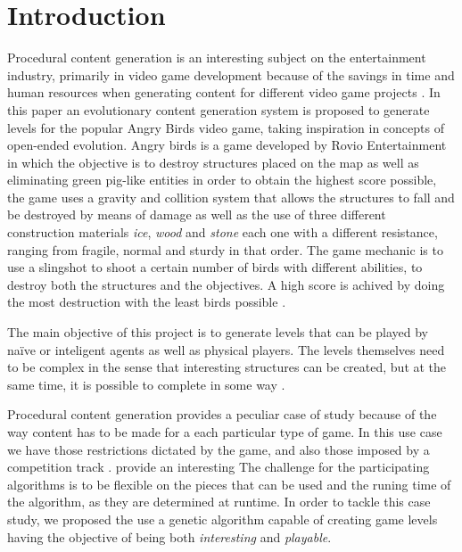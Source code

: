 \documentclass[conference]{IEEEtran}
\begin{document}
\section{Introduction}
Procedural content generation is an interesting subject on the entertainment
industry, primarily in video game development because of the savings in 
time and human resources when generating content for different video game projects \cite{Yannakakis2017,YannakakisContentGeneration}.
In this paper an evolutionary content generation system is proposed to generate
levels for the popular Angry Birds video game,
taking inspiration in concepts of open-ended evolution. Angry birds is a game 
developed by Rovio Entertainment in which the objective is to destroy structures
placed on the map as well as eliminating
green pig-like entities in order to obtain the highest score possible, the game
uses a gravity and collition system that allows the structures to fall and be
destroyed by means of damage as well as the use of three different construction
materials \textit{ice}, \textit{wood} and \textit{stone} each one with a different
resistance, ranging from fragile, normal and sturdy in that order. The game
mechanic is to use a slingshot to shoot a certain number of birds with different
abilities, to destroy both the structures and the objectives. A high score 
is achived by doing the most destruction with the least birds possible 
\cite{RovioEntertainmentCorporation2009}.

The main objective of this project is to generate levels that can be played
by naïve or inteligent agents as well as physical players. The levels
themselves need to be complex in the sense that interesting structures can be
created, but at the same time, it is possible to complete in some way
\cite{Stephenson,Stephenson2018}.

Procedural content generation provides a peculiar case of study because of the
way
content has to be made for a each particular type of game. In this use case we
have those restrictions dictated by the game, and also those imposed by a
competition track \cite{Renz}.%
provide an interesting The challenge for the participating algorithms is to be
flexible on the pieces that can be used and the runing time of the algorithm, as
they are determined at runtime. 
In order to tackle this case study, we proposed the use a genetic algorithm
capable of creating game levels having the objective of being both
\textit{interesting} and \textit{playable}.
\end{document}
